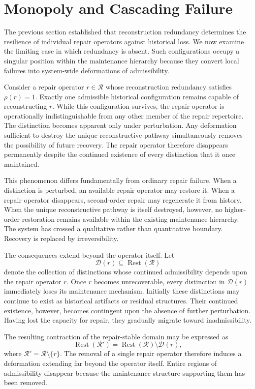 \documentclass[12pt,oneside]{article}
\theoremstyle{plain}
\theoremstyle{definition}
\theoremstyle{remark}
\theoremstyle{plain}
\DeclareMathOperator{\Rest}{Rest}
\begin{document}
\section{Monopoly and Cascading Failure}

The previous section established that reconstruction redundancy determines the resilience of
individual repair operators against historical loss. We now examine the limiting case in which
redundancy is absent. Such configurations occupy a singular position within the maintenance
hierarchy because they convert local failures into system-wide deformations of admissibility.

Consider a repair operator $r \in \mathcal{R}$ whose reconstruction redundancy satisfies
$\rho(r) = 1$. Exactly one admissible historical configuration remains capable of reconstructing
$r$. While this configuration survives, the repair operator is operationally indistinguishable from
any other member of the repair repertoire. The distinction becomes apparent only under perturbation.
Any deformation sufficient to destroy the unique reconstructive pathway simultaneously removes the
possibility of future recovery. The repair operator therefore disappears permanently despite the
continued existence of every distinction that it once maintained.

This phenomenon differs fundamentally from ordinary repair failure. When a distinction is perturbed,
an available repair operator may restore it. When a repair operator disappears, second-order repair
may regenerate it from history. When the unique reconstructive pathway is itself destroyed, however,
no higher-order restoration remains available within the existing maintenance hierarchy. The system
has crossed a qualitative rather than quantitative boundary. Recovery is replaced by irreversibility.

The consequences extend beyond the operator itself. Let
\[
\mathcal{D}(r) \subseteq \Rest(\mathcal{R})
\]
denote the collection of distinctions whose continued admissibility depends upon the repair operator
$r$. Once $r$ becomes unrecoverable, every distinction in $\mathcal{D}(r)$ immediately loses its
maintenance mechanism. Initially these distinctions may continue to exist as historical artifacts or
residual structures. Their continued existence, however, becomes contingent upon the absence of
further perturbation. Having lost the capacity for repair, they gradually migrate toward
inadmissibility.

The resulting contraction of the repair-stable domain may be expressed as
\[
\Rest(\mathcal{R}') = \Rest(\mathcal{R}) \setminus \mathcal{D}(r),
\]
where $\mathcal{R}' = \mathcal{R} \setminus \{r\}$. The removal of a single repair operator
therefore induces a deformation extending far beyond the operator itself. Entire regions of
admissibility disappear because the maintenance structure supporting them has been removed.
\end{document}
